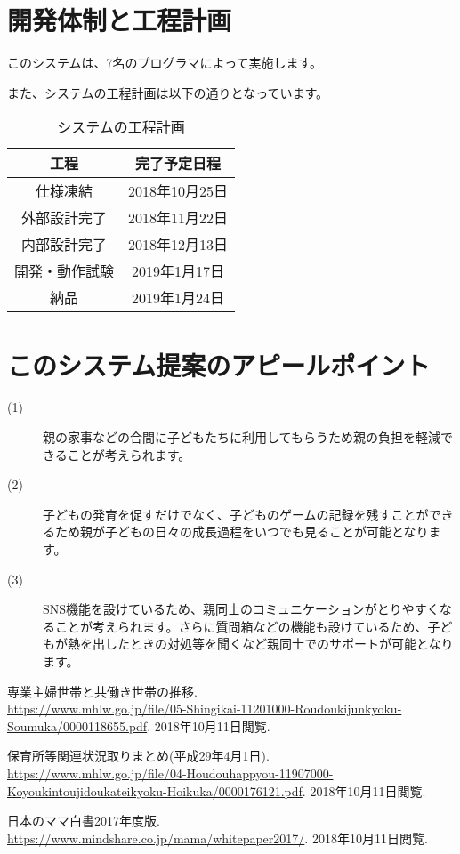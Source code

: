 \documentclass[a4j]{jarticle}
\begin{document}
\section{開発体制と工程計画}
このシステムは、7名のプログラマによって実施します。\par
また、システムの工程計画は以下の通りとなっています。

\begin{table}[!h]
  \centering
  \caption{システムの工程計画}
  \begin{tabular}{|c|c|}
    \hline
    \multicolumn{1}{|c|}{工程} & \multicolumn{1}{c|}{完了予定日程} \\ \hline \hline
    仕様凍結 & 2018年10月25日  \\ \hline
    外部設計完了 & 2018年11月22日  \\ \hline
    内部設計完了 & 2018年12月13日 \\ \hline
    開発・動作試験 & 2019年1月17日  \\ \hline
    納品 & 2019年1月24日  \\ \hline
  \end{tabular}
\end{table}


\section{このシステム提案のアピールポイント}
\begin{description}
\item[(1)]親の家事などの合間に子どもたちに利用してもらうため親の負担を軽減できることが考えられます。
\item[(2)]子どもの発育を促すだけでなく、子どものゲームの記録を残すことができるため親が子どもの日々の成長過程をいつでも見ることが可能となります。
\item[(3)]SNS機能を設けているため、親同士のコミュニケーションがとりやすくなることが考えられます。さらに質問箱などの機能も設けているため、子どもが熱を出したときの対処等を聞くなど親同士でのサポートが可能となります。
\end{description}



\begin{thebibliography}{3}
  専業主婦世帯と共働き世帯の推移.\\
  \url{https://www.mhlw.go.jp/file/05-Shingikai-11201000-Roudoukijunkyoku-Soumuka/0000118655.pdf}.
  \newblock 2018年10月11日閲覧.

  保育所等関連状況取りまとめ(平成29年4月1日).\\
  \url{https://www.mhlw.go.jp/file/04-Houdouhappyou-11907000-Koyoukintoujidoukateikyoku-Hoikuka/0000176121.pdf}.
  \newblock 2018年10月11日閲覧.

  日本のママ白書2017年度版.\\
  \url{https://www.mindshare.co.jp/mama/whitepaper2017/}.
  \newblock 2018年10月11日閲覧.
\end{thebibliography}
\end{document}
